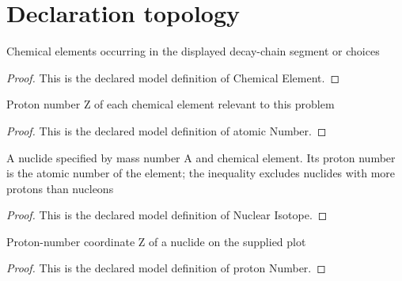 \section{Declaration topology}
\begin{definition}
  \label{def:physics:phyx-mini-0574:phyxminiproblems-problemphyxmini0574-chemicalelement}
  Chemical elements occurring in the displayed decay-chain segment or choices
\end{definition}
\begin{proof}
  This is the declared model definition of Chemical Element.
\end{proof}
\begin{definition}
  \label{def:physics:phyx-mini-0574:phyxminiproblems-problemphyxmini0574-chemicalelement-atomicnumber}
  Proton number Z of each chemical element relevant to this problem
\end{definition}
\begin{proof}
  This is the declared model definition of atomic Number.
\end{proof}
\begin{definition}
  \label{def:physics:phyx-mini-0574:phyxminiproblems-problemphyxmini0574-nuclearisotope}
  A nuclide specified by mass number A and chemical element. Its proton number is the atomic number of the element; the inequality excludes nuclides with more protons than nucleons
\end{definition}
\begin{proof}
  This is the declared model definition of Nuclear Isotope.
\end{proof}
\begin{definition}
  \label{def:physics:phyx-mini-0574:phyxminiproblems-problemphyxmini0574-nuclearisotope-protonnumber}
  Proton-number coordinate Z of a nuclide on the supplied plot
\end{definition}
\begin{proof}
  This is the declared model definition of proton Number.
\end{proof}
